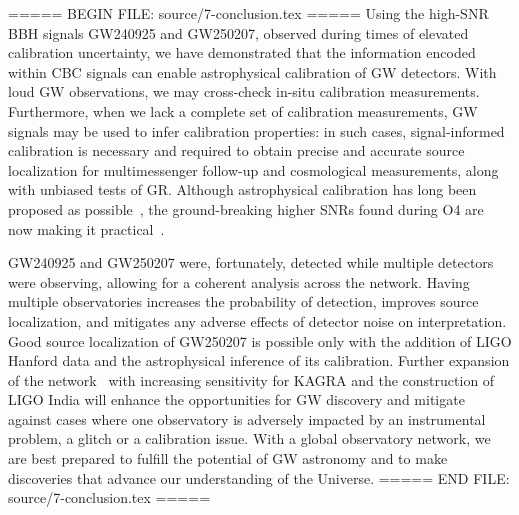 ===== BEGIN FILE: source/7-conclusion.tex =====
Using the high-\ac{SNR} \ac{BBH} signals \ac{GW240925} and \ac{GW250207}, observed during times of elevated calibration uncertainty, we have demonstrated that the information encoded within \ac{CBC} signals can enable astrophysical calibration of \ac{GW} detectors.
With loud \ac{GW} observations, we may cross-check in-situ calibration measurements.
Furthermore, when we lack a complete set of calibration measurements, \ac{GW} signals may be used to infer calibration properties: in such cases, signal-informed calibration is necessary and required to obtain precise and accurate source localization for multimessenger follow-up and cosmological measurements, along with unbiased tests of \ac{GR}.
Although astrophysical calibration has long been proposed as possible~\cite{Pitkin:2015kgm,Essick:2019dow,Schutz:2020hyz,Essick:2022vzl}, the ground-breaking higher \acp{SNR} found during \ac{O4} are now making it practical~\cite{Essick:2019dow,Payne:2020myg,Vitale:2020gvb}.

\ac{GW240925} and \ac{GW250207} were, fortunately, detected while multiple detectors were observing, allowing for a coherent analysis across the network.
Having multiple observatories increases the probability of detection, improves source localization, and mitigates any adverse effects of detector noise on interpretation.
Good source localization of \ac{GW250207} is possible only with the addition of \ac{LIGO} Hanford data and the astrophysical inference of its calibration.
Further expansion of the network~\cite{Abbott:2020qfu,LIGOScientific:2025hdt} with increasing sensitivity for KAGRA and the construction of \ac{LIGO} India will enhance the opportunities for \ac{GW} discovery and mitigate against cases where one observatory is adversely impacted by an instrumental problem, a glitch or a calibration issue.
With a global observatory network, we are best prepared to fulfill the potential of \ac{GW} astronomy and to make discoveries that advance our understanding of the Universe.
===== END FILE: source/7-conclusion.tex =====

